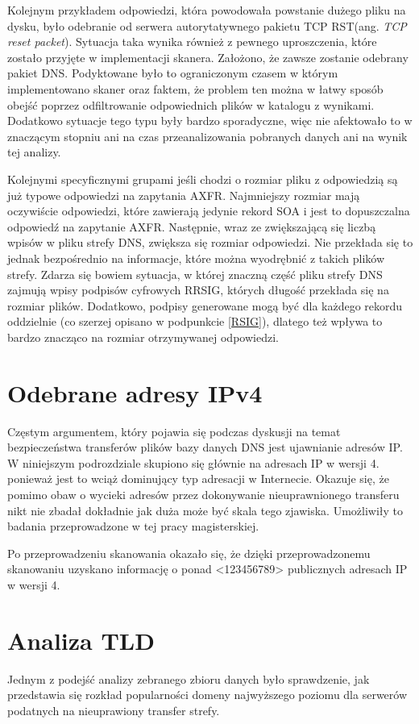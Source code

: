 Kolejnym przykładem odpowiedzi, która powodowała powstanie dużego pliku na dysku, było odebranie od serwera autorytatywnego pakietu TCP RST(ang. \textit{TCP reset packet}). Sytuacja taka wynika również z pewnego uproszczenia, które zostało przyjęte w implementacji skanera. Założono, że zawsze zostanie odebrany pakiet DNS. Podyktowane było to ograniczonym czasem w którym implementowano skaner oraz faktem, że problem ten można w łatwy sposób obejść poprzez odfiltrowanie odpowiednich plików w katalogu z wynikami. Dodatkowo sytuacje tego typu były bardzo sporadyczne, więc nie afektowało to w znaczącym stopniu ani na czas przeanalizowania pobranych danych ani na wynik tej analizy.

Kolejnymi specyficznymi grupami jeśli chodzi o rozmiar pliku z odpowiedzią są już typowe odpowiedzi na zapytania AXFR. Najmniejszy rozmiar mają oczywiście odpowiedzi, które zawierają jedynie rekord SOA i jest to dopuszczalna odpowiedź na zapytanie AXFR. Następnie, wraz ze zwiększającą się liczbą wpisów w pliku strefy DNS, zwiększa się rozmiar odpowiedzi. Nie przekłada się to jednak bezpośrednio na informacje, które można wyodrębnić z takich plików strefy. Zdarza się bowiem sytuacja, w której znaczną część pliku strefy DNS zajmują wpisy podpisów cyfrowych RRSIG, których długość przekłada się na rozmiar plików. Dodatkowo, podpisy generowane mogą być dla każdego rekordu oddzielnie (co szerzej opisano w podpunkcie \ref{RSIG}), dlatego też wpływa to bardzo znacząco na rozmiar otrzymywanej odpowiedzi.

\section{Odebrane adresy IPv4}
Częstym argumentem, który pojawia się podczas dyskusji na temat bezpieczeństwa transferów plików bazy danych DNS jest ujawnianie adresów IP. W niniejszym podrozdziale skupiono się głównie na adresach IP w wersji 4. ponieważ jest to wciąż dominujący typ adresacji w Internecie. Okazuje się, że pomimo obaw o wycieki adresów przez dokonywanie nieuprawnionego transferu nikt nie zbadał dokładnie jak duża może być skala tego zjawiska. Umożliwiły to badania przeprowadzone w tej pracy magisterskiej.

Po przeprowadzeniu skanowania okazało się, że dzięki przeprowadzonemu skanowaniu uzyskano informację o ponad <123456789> publicznych adresach IP w wersji 4. 

\section{Analiza TLD}
Jednym z podejść analizy zebranego zbioru danych było sprawdzenie, jak przedstawia się rozkład popularności domeny najwyższego poziomu dla serwerów podatnych na nieuprawiony transfer strefy. 

